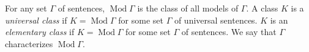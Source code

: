 For any set $\Gamma$ of sentences, $\operatorname{Mod} \Gamma$ is the class of all models of $\Gamma$. A class $K$ is a \textit{universal class} if $K = \operatorname{Mod} \Gamma$ for some set $\Gamma$ of universal sentences. $K$ is an \textit{elementary class} if $K = \operatorname{Mod} \Gamma$ for some set $\Gamma$ of sentences. We say that $\Gamma$ characterizes $\operatorname{Mod} \Gamma$.
